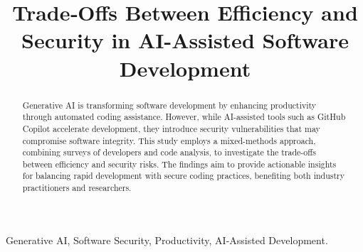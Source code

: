 \documentclass[conference]{IEEEtran} %
\begin{document}
\title{Trade‐Offs Between Efficiency and Security in AI-Assisted Software Development}

\author{
}

\maketitle

\begin{abstract}
Generative AI is transforming software development by enhancing productivity through automated coding assistance. However, while AI-assisted tools such as GitHub Copilot accelerate development, they introduce security vulnerabilities that may compromise software integrity. This study employs a mixed-methods approach, combining surveys of developers and code analysis, to investigate the trade-offs between efficiency and security risks. The findings aim to provide actionable insights for balancing rapid development with secure coding practices, benefiting both industry practitioners and researchers.
\end{abstract}

\begin{IEEEkeywords}
Generative AI, Software Security, Productivity, AI-Assisted Development.
\end{IEEEkeywords}

 











\begin{IEEEbiography}{}
\end{IEEEbiography}

\twocolumn
\printbibliography
\end{document}
